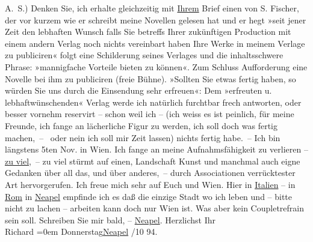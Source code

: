 \begin{ledgroupsized}[t]{13cm}
               A. S.)\pend
           \pstart
           Denken Sie, ich erhalte gleichzeitig mit \uline{Ihrem} Brief
               einen von S. Fischer, der vor kurzem wie er
               schreibt meine Novellen gelesen hat und er hegt »seit jener Zeit den lebhaften Wunsch
                  {\pb}falls Sie betreffs Ihrer
               zukünftigen Production mit einem andern Verlag noch nichts vereinbart haben Ihre
               Werke in meinem Verlage zu publiciren« folgt eine Schilderung seines Verlages und die
               inhaltsschwere Phrase: »mannigfache Vorteile bieten zu können«. Zum Schluss
               Aufforderung eine Novelle bei ihm zu publiciren (freie Bühne). »Sollten Sie {\pb}etwas fertig haben, so würden Sie uns durch die Einsendung sehr erfreuen«: Dem
               »erfreuten u. lebhaftwünschenden« Verlag werde ich natürlich furchtbar frech
               antworten, oder besser vornehm reservirt – schon weil ich – (ich weiss es ist
               peinlich, für meine Freunde, ich fange an lächerliche Figur zu werden, ich soll doch
               was fer{\pb}tig machen, –  oder nein
               ich soll mir Zeit lassen) nichts fertig habe. –\pend
           \pstart
           Ich bin längstens 5ten Nov. in Wien.
               Ich fange an meine Aufnahmsfähigkeit zu verlieren – \uline{zu
                  viel}, – zu viel stürmt auf einen, Landschaft Kunst und manchmal {\pb}auch eigne Gedanken über all das,
               und über anderes, – durch Associationen verrücktester Art hervorgerufen.\pend
           \pstart
           Ich freue mich sehr auf Euch und Wien. Hier in \uline{Italien} – in \uline{Rom} in \uline{Neapel} empfinde ich es daß die einzige Stadt wo ich leben {\pb}und – bitte nicht zu lachen –
               arbeiten kann doch nur Wien ist. Was aber kein
               Coupletrefrain sein soll. Schreiben Sie mir bald, – \uline{Neapel}.\pend
           \pstart
           Herzlichst Ihr{\\[\baselineskip]}\spacefill\mbox{Richard}\pend
           \leftskip=0em{}\pstart
           Donnerstag\hspace*{1.5em}\uline{Neapel}\pend
           /10 94.\pend
           
         
         \endnumbering{}\end{ledgroupsized}  \newcommand{\dateiname}{L00384}\newcommand{\titel}{Richard Beer-Hofmann an Arthur Schnitzler, 18. 10. 1894}\newcommand{\editorInnen}{Martin Anton Müller und Gerd-Hermann Susen}
      